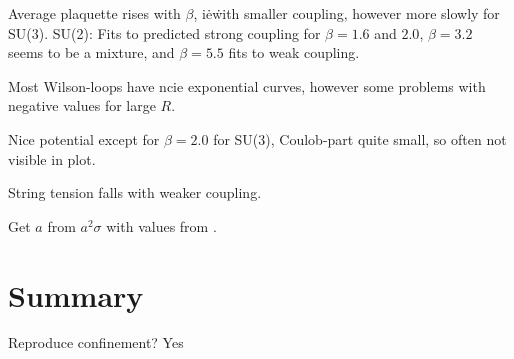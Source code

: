 \documentclass[%
 reprint,
 amsmath,amssymb,
 aps,
]{revtex4-1}
\begin{document}
Average plaquette rises with $\beta$, i\.e\. with smaller coupling, however more slowly for SU(3). SU(2): Fits to predicted strong coupling for $\beta=1.6$ and $2.0$, $\beta=3.2$ seems to be a mixture, and $\beta=5.5$ fits to weak coupling.

Most Wilson-loops have ncie exponential curves, however some problems with negative values for large $R$. 

Nice potential except for $\beta=2.0$ for SU(3), Coulob-part quite small, so often not visible in plot.

String tension falls with weaker coupling.

Get $a$ from $a^2\sigma$ with values from \cite{Cardoso_2011}.
%
%

\section{Summary}

Reproduce confinement? Yes


\end{document}
